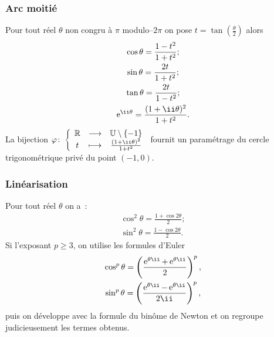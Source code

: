 \subsubsection{Arc moitié}
\label{subsubsec:arcmoitie}
Pour tout réel $\theta$ non congru à $\pi$ modulo--$2\pi$ on pose $t=\tan \left( \frac{\theta}{2} \right)$ alors
\begin{gather}
  \cos \theta = \dfrac{1-t^2}{1+t^2};\\ 
  \sin \theta = \dfrac{2t}{1+t^2}; \\ 
  \tan \theta = \frac{2t}{1-t^2};\\
  \e^{\ii \theta}=\frac{(1+\ii \theta)^2}{1+t^2}.
\end{gather}
La bijection $\fonction{\varphi}{\R}{\U\setminus \{-1\}}{t}{\frac{(1+\ii \theta)^2}{1+t^2}}$ fournit un paramétrage du cercle trigonométrique privé du point $(-1,0)$.
%
\subsubsection{Linéarisation}
\label{subsubsec:linearisation}
Pour tout réel $\theta$ on a~:
\begin{gather}
  \cos^2 \theta = \frac{1+\cos 2\theta}{2}; \\ 
  \sin^2 \theta = \frac{1-\cos 2\theta}{2}.
\end{gather}
Si l'exposant $p \geq 3$, on utilise les formules d'Euler 
\begin{gather}
  \cos^p \theta = \left(\frac{\expc{}{\theta}+\expc{}{\theta}}{2} \right)^p, \\ 
  \sin^p \theta = \left(\frac{\expc{}{\theta}-\expc{}{\theta}}{2 \ii} \right)^p,
\end{gather}
puis on développe avec la formule du binôme de Newton et on regroupe judicieusement les termes obtenus.
%
